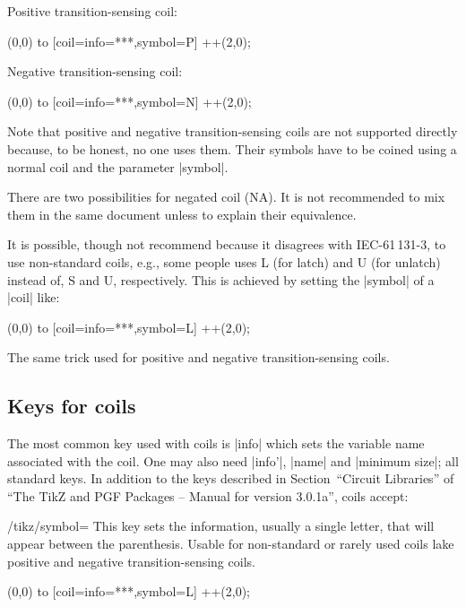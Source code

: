 \documentclass[a4paper]{ltxdoc}
\begin{document}
Positive transition-sensing coil:
\begin{codeexample}[width=2.3cm]
  \draw(0,0) to [coil={info={***},symbol=P}] ++(2,0);
\end{codeexample}

Negative transition-sensing coil:
\begin{codeexample}[width=2.3cm]
  \draw(0,0) to [coil={info={***},symbol=N}] ++(2,0);
\end{codeexample}

Note that positive and negative transition-sensing coils are not supported directly because, to be honest, no one uses them. Their symbols have to be coined using a normal coil and the parameter |symbol|.

There are two possibilities for negated coil (NA). It is not recommended to mix them in the same document unless to explain their equivalence.

It is possible, though not recommend because it disagrees with IEC-61\,131-3, to use non-standard coils, e.g., some people uses L (for latch) and U (for unlatch) instead of, S and U, respectively. This is achieved by setting the |symbol| of a |coil| like:

\begin{codeexample}[width=2.3cm]
  \draw(0,0) to [coil={info={***},symbol=L}] ++(2,0);
\end{codeexample}
\noindent{}The same trick used for positive and negative transition-sensing coils.


\subsection{Keys for coils}

The most common key used with coils is |info| which sets the variable name associated with the coil. One may also need |info'|, |name| and |minimum size|; all standard keys. In addition to the keys described in Section~``Circuit Libraries'' of ``The TikZ and PGF Packages -- Manual for version 3.0.1a'', coils accept: 
\begin{key}{/tikz/symbol=}
This key sets the information, usually a single letter, that will appear between the parenthesis. Usable for non-standard or rarely used coils lake positive and negative transition-sensing coils.
\begin{codeexample}[width=2.3cm]
  \draw(0,0) to [coil={info={***},symbol=L}] ++(2,0);
\end{codeexample}
\end{key}
\end{document}
